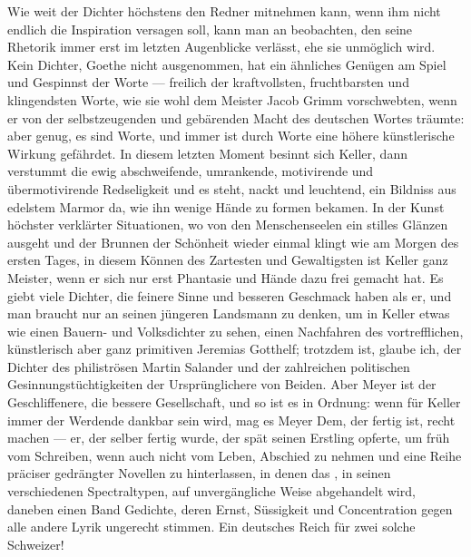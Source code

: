 Wie weit der Dichter höchstens den Redner mitnehmen kann, wenn ihm nicht endlich die Inspiration versagen soll, kann man an  beobachten, den seine Rhetorik immer erst im letzten Augenblicke verlässt, ehe sie unmöglich wird. Kein Dichter, Goethe nicht ausgenommen, hat ein ähnliches Genügen am Spiel und Gespinnst der Worte — freilich der kraftvollsten, fruchtbarsten und klingendsten Worte, wie sie wohl dem Meister Jacob Grimm vorschwebten, wenn er von der selbstzeugenden und gebärenden Macht des deutschen Wortes träumte: aber genug, es sind Worte, und immer ist durch Worte eine höhere künstlerische Wirkung gefährdet. In diesem letzten Moment besinnt sich Keller, dann verstummt die ewig abschweifende, umrankende, motivirende und übermotivirende Redseligkeit und es steht, nackt und leuchtend, ein Bildniss aus edelstem Marmor da, wie ihn wenige Hände zu formen bekamen. In der Kunst höchster verklärter Situationen, wo von den Menschenseelen ein stilles Glänzen ausgeht und der Brunnen der Schönheit wieder einmal klingt wie am Morgen des ersten Tages, in diesem Können des Zartesten und Gewaltigsten ist Keller ganz Meister, wenn er sich nur erst Phantasie und Hände dazu frei gemacht hat. Es giebt viele Dichter, die feinere Sinne und besseren Geschmack haben als er, und man braucht nur an seinen jüngeren Landsmann  zu denken, um in Keller etwas wie einen Bauern- und Volksdichter zu sehen, einen Nachfahren des vortrefflichen, künstlerisch aber ganz primitiven Jeremias Gotthelf; trotzdem ist, glaube ich, der Dichter des philiströsen Martin Salander und der zahlreichen politischen Gesinnungstüchtigkeiten der Ursprünglichere von Beiden. Aber Meyer ist der Geschliffenere, die bessere Gesellschaft, und so ist es in Ordnung: wenn für Keller immer der Werdende dankbar sein wird, mag es Meyer Dem, der fertig ist, recht machen — er, der selber fertig wurde, der spät seinen Erstling opferte, um früh vom Schreiben, wenn auch nicht vom Leben, Abschied zu nehmen und eine Reihe präciser gedrängter Novellen zu hinterlassen, in denen das , in seinen verschiedenen Spectraltypen, auf unvergängliche Weise abgehandelt wird, daneben einen Band Gedichte, deren Ernst, Süssigkeit und Concentration gegen alle andere Lyrik ungerecht stimmen. Ein deutsches Reich für zwei solche Schweizer!
\par


